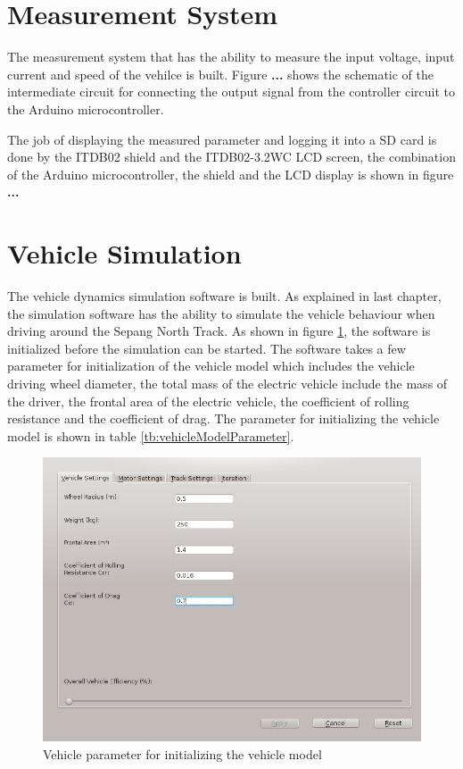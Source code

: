 \section{Measurement System}
The measurement system that has the ability to measure the input voltage, input current and speed of the vehilce is built. Figure \textbf{...} shows the schematic of the intermediate circuit for connecting the output signal from the controller circuit to the Arduino microcontroller. 

The job of displaying the measured parameter and logging it into a SD card is done by the ITDB02 shield and the ITDB02-3.2WC LCD screen, the combination of the Arduino microcontroller, the shield and the LCD display is shown in figure \textbf{...}

\section{Vehicle Simulation}
The vehicle dynamics simulation software is built. As explained in last chapter, the simulation software has the ability to simulate the vehicle behaviour when driving around the Sepang North Track. As shown in figure \ref{im:vehicleSettings}, the software is initialized before the simulation can be started. The software takes a few parameter for initialization of the vehicle model which includes the vehicle driving wheel diameter, the total mass of the electric vehicle include the mass of the driver, the frontal area of the electric vehicle, the coefficient of rolling resistance and the coefficient of drag. The parameter for initializing the vehicle model is shown in table \ref{tb:vehicleModelParameter}.

\begin{figure}[htb]
	\centering
	\includegraphics[width=5in]{images/vehicle_settings.jpg}
	\caption{Vehicle parameter for initializing the vehicle model}
	\label{im:vehicleSettings}
\end{figure}

